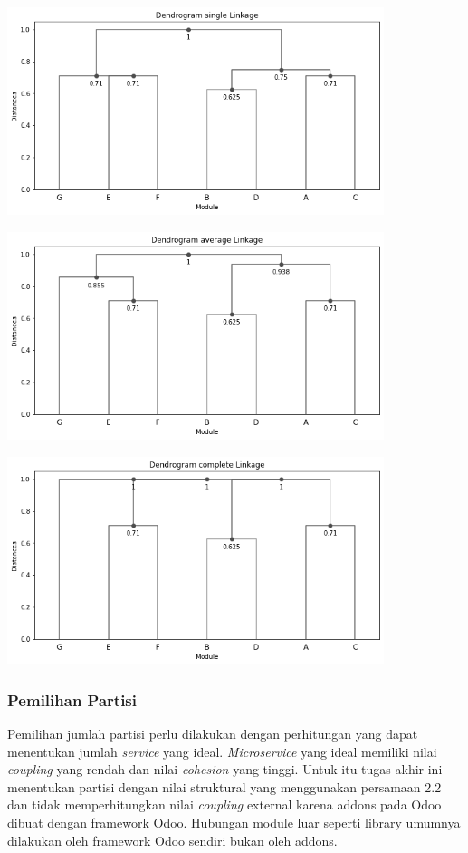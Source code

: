 \begin{center}
	\includegraphics[width=11cm]{img/bab_3/singleLink.png}
	\label{fig:asd}
\end{center}
\begin{center}
	\includegraphics[width=11cm]{img/bab_3/averageLink.png}
	\label{fig:asd}
\end{center}
\begin{center}
	\includegraphics[width=11cm]{img/bab_3/completeLink.png}
	\label{fig:asd}
\end{center}

\subsubsection{Pemilihan Partisi}
Pemilihan jumlah partisi perlu dilakukan dengan perhitungan yang dapat menentukan jumlah \textit{service} yang ideal. \textit{Microservice} yang ideal memiliki nilai \textit{coupling} yang rendah dan nilai \textit{cohesion} yang tinggi. Untuk itu tugas akhir ini menentukan partisi dengan nilai struktural yang menggunakan persamaan 2.2 dan tidak memperhitungkan nilai \textit{coupling} external karena addons pada Odoo dibuat dengan framework Odoo. Hubungan module luar seperti library umumnya dilakukan oleh framework Odoo sendiri bukan oleh addons.

